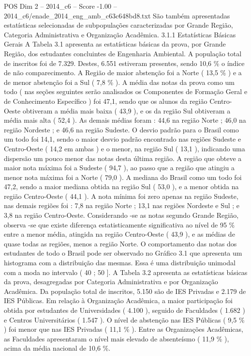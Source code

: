 \begin{textsample}{POS Dim 2 – 2014\_c6 – Score -1.00 – 2014\_c6/enade\_2014\_eng\_amb\_c63c648bd8.txt}
São também apresentadas estatísticas selecionadas de subpopulações caracterizadas por Grande Região, Categoria Administrativa e Organização Acadêmica. 3.1.1 Estatísticas Básicas Gerais A Tabela 3.1 apresenta as estatísticas básicas da prova, por Grande Região, dos estudantes concluintes de Engenharia Ambiental.
A população total de inscritos foi de 7.329.
Destes, 6.551 estiveram presentes, sendo 10,6 \% o índice de não comparecimento.
A Região de maior abstenção foi a Norte ( 13,5 \% ) e a de menor abstenção foi a Sul ( 7,8 \% ).
A média das notas da prova como um todo ( nas seções seguintes serão analisados os Componentes de Formação Geral e de Conhecimento Específico ) foi 47,1, sendo que os alunos da região Centro-Oeste obtiveram a média mais baixa ( 43,9 ), e os da região Sul obtiveram a média mais alta ( 52,4 ).
As demais médias foram : 44,6 na região Norte ; 46,0 na região Nordeste ; e 46,6 na região Sudeste.
O desvio padrão para o Brasil como um todo foi 14,1, sendo o maior desvio padrão encontrado nas regiões Sudeste e Centro-Oeste ( 14,2 em ambas ) e o menor, na região Sul ( 13,1 ), indicando uma dispersão um pouco menor das notas desta última região.
A região que obteve a maior nota máxima foi a Sudeste ( 94,7 ), ao passo que a região que atingiu a menor nota máxima foi a Norte ( 79,0 ).
A mediana do Brasil como um todo foi 47,2, sendo a maior mediana obtida na região Sul ( 53,0 ), e a menor obtida na região Centro-Oeste ( 44,1 ).
A nota mínima foi zero apenas na região Sudeste, nas demais regiões foi : 7,8 na região Norte ; 13,1 nas regiões Nordeste e Sul ; e 3,8 na região Centro-Oeste.
Considerando -se as notas segundo Grande Região, observa -se que existe diferença estatisticamente significativa ao nível de 95 \% entre a menor média, atingida na região Centro-Oeste ( 43,9 ), e as médias de quase todas as regiões, menos a região Norte.
O comportamento das notas dos estudantes de todo o Brasil pode ser observado no Gráfico 3.1 que apresenta um histograma com a distribuição das mesmas.
Essa é uma distribuição unimodal com a moda no intervalo ( 40 ; 50 ].
A Tabela 3.2 apresenta as estatísticas básicas da prova, desagregadas por Categoria Administrativa e por Organização Acadêmica.
Da população total de inscritos, 5.150 são de IES Privadas e 2.179 de IES Públicas.
Em relação à Organização Acadêmica, a maior participação foi obtida por estudantes de Universidades ( 4.100 ), seguido de Faculdades ( 1.682 ) e Centros Universitários ( 1.547 ).
O nível de abstenção nas IES Públicas ( 9,5 \% ) foi menor que nas IES Privadas ( 11,1 \% ).
Entre as Organizações Acadêmicas, as Faculdades apresentaram o nível mais elevado de absenteísmo ( 11,9 \% ), acima da média nacional de 10,6 \%.

\end{textsample}
